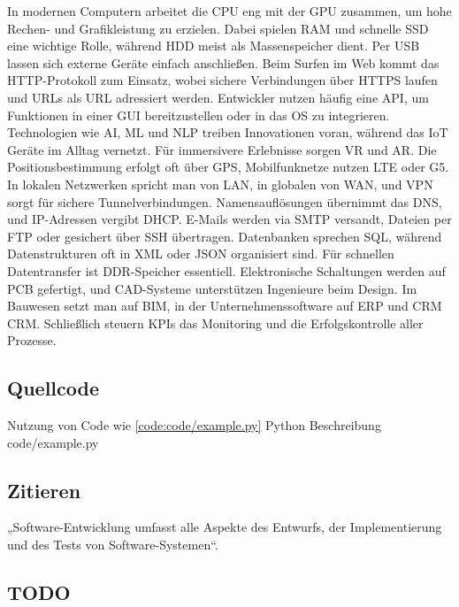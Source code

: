 In modernen Computern arbeitet die \ac{CPU} eng mit der \ac{GPU} zusammen, um hohe Rechen- und Grafikleistung zu erzielen. Dabei spielen \ac{RAM} und schnelle \ac{SSD} eine wichtige Rolle, während \ac{HDD} meist als Massenspeicher dient. Per \ac{USB} lassen sich externe Geräte einfach anschließen. Beim Surfen im Web kommt das \ac{HTTP}-Protokoll zum Einsatz, wobei sichere Verbindungen über \ac{HTTPS} laufen und URLs als \ac{URL} adressiert werden. Entwickler nutzen häufig eine \ac{API}, um Funktionen in einer \ac{GUI} bereitzustellen oder in das \ac{OS} zu integrieren. Technologien wie \ac{AI}, \ac{ML} und \ac{NLP} treiben Innovationen voran, während das \ac{IoT} Geräte im Alltag vernetzt. Für immersivere Erlebnisse sorgen \ac{VR} und \ac{AR}. Die Positionsbestimmung erfolgt oft über \ac{GPS}, Mobilfunknetze nutzen \ac{LTE} oder \ac{G5}. In lokalen Netzwerken spricht man von \ac{LAN}, in globalen von \ac{WAN}, und \ac{VPN} sorgt für sichere Tunnelverbindungen. Namensauflösungen übernimmt das \ac{DNS}, und IP-Adressen vergibt \ac{DHCP}. E-Mails werden via \ac{SMTP} versandt, Dateien per \ac{FTP} oder gesichert über \ac{SSH} übertragen. Datenbanken sprechen \ac{SQL}, während Datenstrukturen oft in \ac{XML} oder \ac{JSON} organisiert sind. Für schnellen Datentransfer ist \ac{DDR}-Speicher essentiell. Elektronische Schaltungen werden auf \ac{PCB} gefertigt, und \ac{CAD}-Systeme unterstützen Ingenieure beim Design. Im Bauwesen setzt man auf \ac{BIM}, in der Unternehmens­software auf \ac{ERP} und \ac{CRM} \ac{CRM}. Schließlich steuern \ac{KPI}s das Monitoring und die Erfolgskontrolle aller Prozesse.

\subsection{Quellcode}
Nutzung von Code wie \autoref{code:code/example.py}
\flexCode
{Python}
{Beschreibung}
{code/example.py}

\subsection{Zitieren}
„Software-Entwicklung umfasst alle Aspekte des Entwurfs, der Implementierung und des Tests von Software-Systemen“. \cite{unpingcoPythonProgrammingData2021}

\subsection{TODO}
